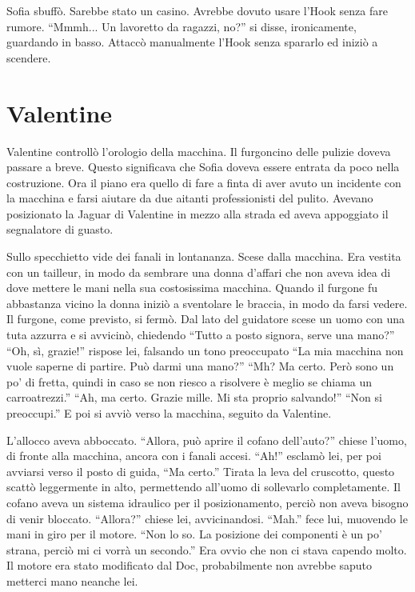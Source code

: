     Sofia sbuffò. Sarebbe stato un casino. Avrebbe dovuto usare l'Hook senza fare rumore. ``Mmmh... Un lavoretto da
    ragazzi, no?'' si disse, ironicamente, guardando in basso. Attaccò manualmente l'Hook senza spararlo ed iniziò a
    scendere.

  \section*{Valentine}

    Valentine controllò l'orologio della macchina. Il furgoncino delle pulizie doveva passare a breve. Questo
    significava che Sofia doveva essere entrata da poco nella costruzione. Ora il piano era quello di fare a finta di
    aver avuto un incidente con la macchina e farsi aiutare da due aitanti professionisti del pulito. Avevano
    posizionato la Jaguar di Valentine in mezzo alla strada ed aveva appoggiato il segnalatore di guasto.

    Sullo specchietto vide dei fanali in lontananza. Scese dalla macchina. Era vestita con un tailleur, in modo da
    sembrare una donna d'affari che non aveva idea di dove mettere le mani nella sua costosissima macchina. Quando il
    furgone fu abbastanza vicino la donna iniziò a sventolare le braccia, in modo da farsi vedere. Il furgone, come
    previsto, si fermò. Dal lato del guidatore scese un uomo con una tuta azzurra e si avvicinò, chiedendo ``Tutto a
    posto signora, serve una mano?'' ``Oh, sì, grazie!'' rispose lei, falsando un tono preoccupato ``La mia macchina non
    vuole saperne di partire. Può darmi una mano?'' ``Mh? Ma certo. Però sono un po' di fretta, quindi in caso se non
    riesco a risolvere è meglio se chiama un carroatrezzi.'' ``Ah, ma certo. Grazie mille. Mi sta proprio salvando!''
    ``Non si preoccupi.'' E poi si avviò verso la macchina, seguito da Valentine.

    L'allocco aveva abboccato. ``Allora, può aprire il cofano dell'auto?'' chiese l'uomo, di fronte alla macchina,
    ancora con i fanali accesi. ``Ah!'' esclamò lei, per poi avviarsi verso il posto di guida, ``Ma certo.'' Tirata la
    leva del cruscotto, questo scattò leggermente in alto, permettendo all'uomo di sollevarlo completamente. Il cofano
    aveva un sistema idraulico per il posizionamento, perciò non aveva bisogno di venir bloccato. ``Allora?'' chiese
    lei, avvicinandosi. ``Mah.'' fece lui, muovendo le mani in giro per il motore. ``Non lo so. La posizione dei
    componenti è un po' strana, perciò mi ci vorrà un secondo.'' Era ovvio che non ci stava capendo molto. Il motore era
    stato modificato dal Doc, probabilmente non avrebbe saputo metterci mano neanche lei.

